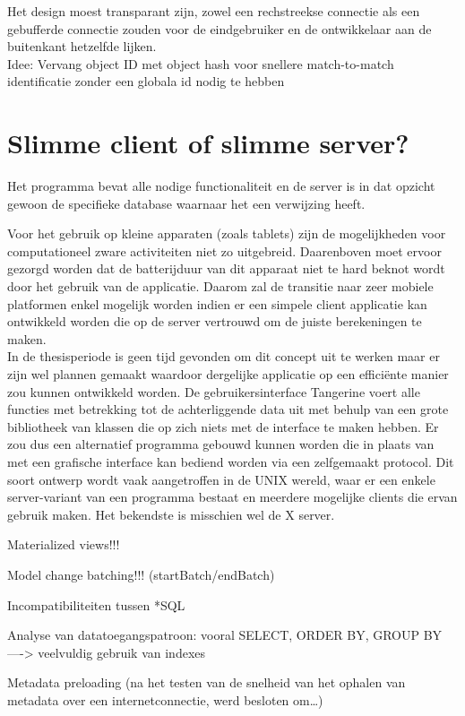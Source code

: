 Het design moest transparant zijn, zowel een rechstreekse connectie als een gebufferde connectie zouden voor de eindgebruiker en de ontwikkelaar aan de buitenkant hetzelfde lijken.\\

Idee: Vervang object ID met object hash voor snellere match-to-match identificatie zonder een globala id nodig te hebben

\section{Slimme client of slimme server?}
Het programma bevat alle nodige functionaliteit en de server is in dat opzicht gewoon de specifieke database waarnaar het een verwijzing heeft.

Voor het gebruik op kleine apparaten (zoals tablets) zijn de mogelijkheden voor computationeel zware activiteiten niet zo uitgebreid. Daarenboven moet ervoor gezorgd worden dat de batterijduur
van dit apparaat niet te hard beknot wordt door het gebruik van de applicatie. Daarom zal de transitie naar zeer mobiele platformen enkel mogelijk worden indien er een simpele client applicatie kan
ontwikkeld worden die op de server vertrouwd om de juiste berekeningen te maken.\\

In de thesisperiode is geen tijd gevonden om dit concept uit te werken maar er zijn wel plannen gemaakt waardoor dergelijke
applicatie op een effici\"ente manier zou kunnen ontwikkeld worden. De gebruikersinterface Tangerine voert alle functies met betrekking tot de achterliggende data uit met behulp van een grote bibliotheek
van klassen die op zich niets met de interface te maken hebben. Er zou dus een alternatief programma gebouwd kunnen worden die in plaats van met een grafische interface kan bediend worden
via een zelfgemaakt protocol. Dit soort ontwerp wordt vaak aangetroffen in de UNIX wereld, waar er een enkele server-variant van een programma bestaat en meerdere mogelijke clients die ervan gebruik maken.
Het bekendste is misschien wel de X server.

Materialized views!!!

Model change batching!!! (startBatch/endBatch)

Incompatibiliteiten tussen *SQL

Analyse van datatoegangspatroon: vooral SELECT, ORDER BY, GROUP BY ---->
veelvuldig gebruik van indexes

Metadata preloading (na het testen van de snelheid van het ophalen van metadata
over een internetconnectie, werd besloten om\ldots)

